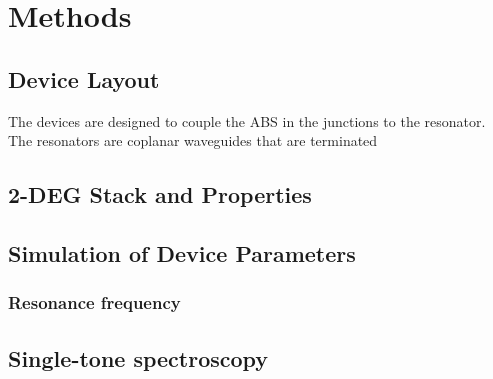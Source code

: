 \section{Methods}

\subsection{Device Layout}

The devices are designed to couple the ABS in the junctions to the resonator. The resonators are coplanar waveguides that are terminated 
\subsection{2-DEG Stack and Properties}

\subsection{Simulation of Device Parameters}
\subsubsection{Resonance frequency}

\subsection{Single-tone spectroscopy}
